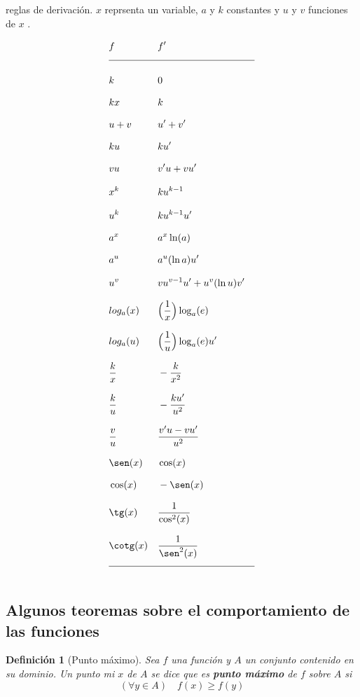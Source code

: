 \documentclass[12pt,a4paper]{extarticle}
\newtheorem{mydef}{Definici\'on}[section]
\begin{document}
\begin{table}[!htbp]
\caption{reglas de derivaci\'on.  \( x \) reprsenta un variable, \( a \) y \( k \)
constantes y \( u \) y \( v \) funciones de \( x \) .
}
\begin{align*}
&  f &  &  f'  & \\[0.75em]
 \hline  \\
& k & & 0 & \\[0.75em]
&  kx &  &  k   & \\[0.75em]
& u+v & & u' + v' &\\[0.75em]
&  ku &  &   ku'   & \\[0.75em]
&  vu &  &  v'u + vu'   & \\[0.75em]
&  x^k & &  ku^{k-1}   & \\[0.75em]
&  u^k  & &  ku^{k-1}u'   & \\[0.75em]
&  a^x  & &  a^x\ln(a)   & \\[0.75em]
&  a^u  & &  a^u(\ln a)u'   & \\[0.75em]
&  u^v  & &  vu^{v-1}u'+u^v(\ln u)v'   & \\[0.75em]
&  log_a(x) & &   \Big(\frac{1}{x}\Big)\log_a(e)  & \\[0.75em]
&  log_a(u) & &   \Big(\frac{1}{u}\Big)\log_a(e)u'  & \\[0.75em]
&  \frac{k}{x} & &  -\frac{k}{x^2}  & \\[0.75em]
&  \frac{k}{u}  & &  -\frac{ku'}{u^2}   & \\[0.75em]
&  \frac{v}{u}  & &  \frac{v'u-vu'}{u^2}  & \\[0.75em]
& \sen(x) & & \cos(x) & \\[0.75em]
& \cos(x) & & -\sen(x) & \\[0.75em]
& \tg(x) & & \frac{1}{\cos^2(x)}  & \\[0.75em]
& \cotg(x) & & \frac{1}{\sen^2(x)}  & \\[0.75em]
\hline \\
\end{align*}
\label{tab:derReg}
\end{table}


\subsection{Algunos teoremas sobre el comportamiento de las funciones}

\begin{mydef}[Punto m\'aximo]
Sea \( f \) una funci\'on y \( A \) un conjunto contenido en su
dominio. Un punto mi \( x \) de \( A \) se dice que es \textbf{punto
  m\'aximo} de \( f \) sobre \( A \)  si
\begin{equation}
(\forall y \in A) \quad f(x) \geq f(y)
\end{equation}
\end{mydef}
\end{document}
